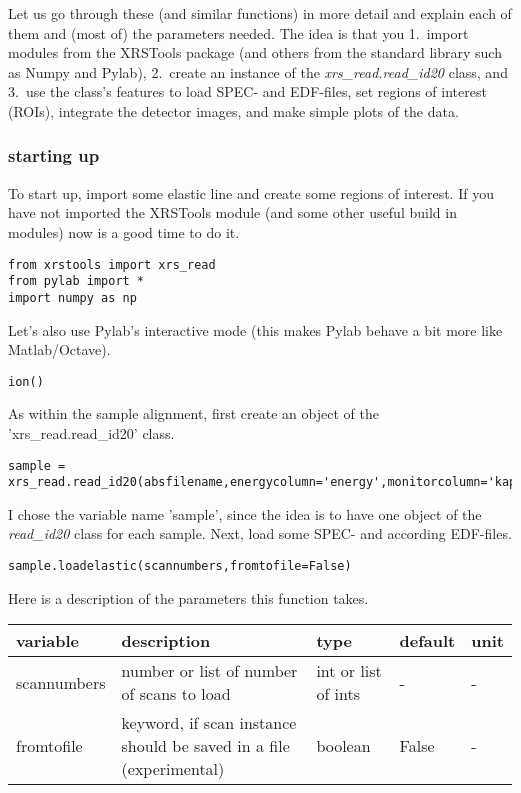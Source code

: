 \documentclass[aps,prl,groupedaddress]{revtex4}
\begin{document}
Let us go through these (and similar functions) in more detail and explain each of them and (most of) the parameters needed. The idea is that you 1.~import modules from the XRSTools package (and others from the standard library such as Numpy and Pylab), 2.~create an instance of the \textit{xrs\_read.read\_id20} class, and 3.~use the class's features to load SPEC- and EDF-files, set regions of interest (ROIs), integrate the detector images, and make simple plots of the data.

\subsubsection{starting up}
To start up, import some elastic line and create some regions of interest. If you have not imported the XRSTools module (and some other useful build in modules) now is a good time to do it.
\begin{lstlisting}[frame=single]
from xrstools import xrs_read
from pylab import *
import numpy as np
\end{lstlisting}
Let's also use Pylab's interactive mode (this makes Pylab behave a bit more like Matlab/Octave).
\begin{lstlisting}[frame=single]
ion()
\end{lstlisting}
As within the sample alignment, first create an object of the 'xrs\_read.read\_id20' class.
\begin{lstlisting}[frame=single]
sample = xrs_read.read_id20(absfilename,energycolumn='energy',monitorcolumn='kap4dio',edfName=None,single_image=True)
\end{lstlisting}
I chose the variable name 'sample', since the idea is to have one object of the \textit{read\_id20} class for each sample. Next, load some SPEC- and according EDF-files.
\begin{lstlisting}[frame=single]
sample.loadelastic(scannumbers,fromtofile=False)
\end{lstlisting}

Here is a description of the parameters this function takes.

\begin{ruledtabular}
\begin{tabular}{lllll}
variable        & description                                          & type     & default  & unit \\
\hline
scannumbers     & number or list of number of scans to load            & int or list of ints   & -        & -    \\
fromtofile      & keyword, if scan instance should be saved in a file (experimental)  & boolean   & False     & -    \\
\end{tabular}
\end{ruledtabular}
\end{document}
